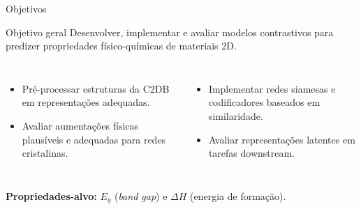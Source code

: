 \documentclass[aspectratio=169,10pt]{beamer}
\newcommand{\tightitem}{\setlength{\itemsep}{3pt}\setlength{\parskip}{0pt}}
\begin{document}
\begin{frame}{Objetivos}
\begin{block}{Objetivo geral}
Desenvolver, implementar e avaliar modelos contrastivos para predizer propriedades físico-químicas de materiais 2D.
\end{block}
\vspace{2mm}
\begin{columns}[T,onlytextwidth]
  \begin{itemize}\tightitem
    \item Pré-processar estruturas da C2DB em representações adequadas.
    \item Avaliar aumentações físicas plausíveis e adequadas para redes cristalinas.
  \end{itemize}
  \begin{itemize}\tightitem
    \item Implementar redes siamesas e codificadores baseados em similaridade.
    \item Avaliar representações latentes em tarefas downstream.
  \end{itemize}
\end{columns}
\vspace{3mm}
\centering
\textbf{Propriedades-alvo:} $E_g$ (\emph{band gap}) e $\Delta H$ (energia de formação).
\end{frame}
\end{document}
